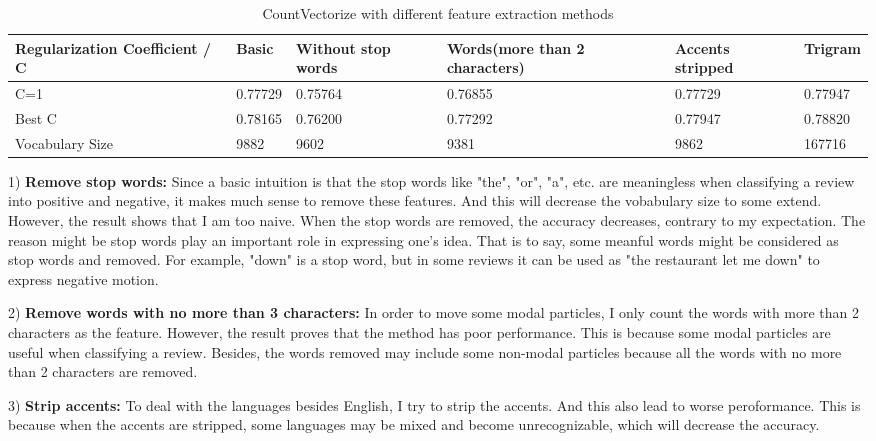 \documentclass[letterpaper, 10 pt, conference]{ieeeconf}  %
\begin{document}
\begin{table}[htb]
	\caption{CountVectorize with different feature extraction methods}  
	\begin{center}  
		\begin{tabu} to 1\textwidth{X[3,c]|X[1,b]|X[2,l]|X[3,c]|X[2,m]|X[1,c]}  
			\hline  
			Regularization Coefficient / C  &Basic             &Without stop words      &Words(more than 2 characters)    &Accents stripped     &Trigram\\  
			\hline  
			C=1    &0.77729       &0.75764           &0.76855    &0.77729      &0.77947\\  
			Best C    &0.78165      &0.76200           &0.77292    &0.77947      &0.78820\\  
			Vocabulary Size    &9882      &9602           &9381   &9862      &167716\\  
			
			\hline  
		\end{tabu}  
	\end{center}  
\end{table} 

1) \textbf{Remove stop words: }Since a basic intuition is that the stop words like "the", "or", "a", etc. are meaningless when classifying a review into positive and negative, it makes much sense to remove these features. And this will decrease the vobabulary size to some extend. However, the result shows that I am too naive. When the stop words are removed, the accuracy decreases, contrary to my expectation. The reason might be stop words play an important role in expressing one's idea. That is to say, some meanful words might be considered as stop words and removed. For example, "down" is a stop word, but in some reviews it can be used as "the restaurant let me down" to express negative motion.

2) \textbf{Remove words with no more than 3 characters: }In order to move some modal particles, I only count the words with more than 2 characters as the feature. However, the result proves that the method has poor performance. This is because some modal particles are useful when classifying a review. Besides, the words removed may include some non-modal particles because all the words with no more than 2 characters are removed.

3) \textbf{Strip accents: }To deal with the languages besides English, I try to strip the accents. And this also lead to worse peroformance. This is because when the accents are stripped, some languages may be mixed and become unrecognizable, which will decrease the accuracy.
\end{document}

